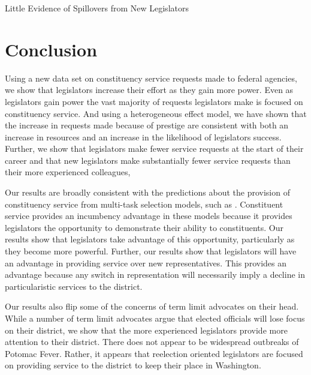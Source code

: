 \documentclass[12pt]{article}
\begin{document}
    

\begin{table}[hbt!]
\caption{Little Evidence of Spillovers from New Legislators} \label{t:spill1}

\begin{minipage}{\textwidth}
\begin{center}

\end{center}
\end{minipage}
\end{table}


\section{Conclusion} \label{s:conclude}

Using a new data set on constituency service requests made to federal agencies, we show that legislators increase their effort as they gain more power.  Even as legislators gain power the vast majority of requests legislators make is focused on constituency service.  And using a heterogeneous effect model, we have shown that the increase in requests made because of prestige are consistent with both an increase in resources and an increase in the likelihood of legislators success. Further, we show that legislators make fewer service requests at the start of their career and that new legislators make substantially fewer service requests than their more experienced colleagues,  

Our results are broadly consistent with the predictions about the provision of constituency service from multi-task selection models, such as \cite{AshworthBuenodeMesquita2006}.  Constituent service provides an incumbency advantage in these models because it provides legislators the opportunity to demonstrate their ability to constituents.  Our results show that legislators take advantage of this opportunity, particularly as they become more powerful.  Further, our results show that legislators will have an advantage in providing service over new representatives.  This provides an advantage because any switch in representation will necessarily imply a decline in particularistic services to the district. 

Our results also flip some of the concerns of term limit advocates on their head.  While a number of term limit advocates argue that elected officials will lose focus on their district, we show that the more experienced legislators provide more attention to their district.  There does not appear to be widespread outbreaks of Potomac Fever.  Rather, it appears that reelection oriented legislators are focused on providing service to the district to keep their place in Washington.   
\end{document}
